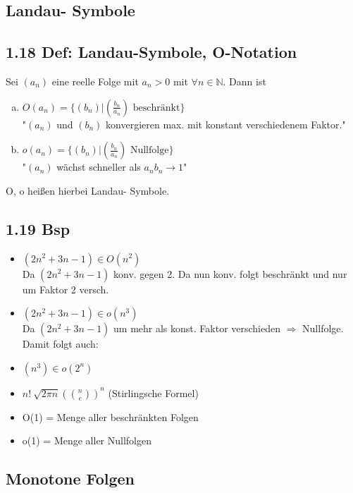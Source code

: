 \documentclass[12pt]{article}
\begin{document}
\subsection*{Landau- Symbole}

\subsection*{1.18 Def: Landau-Symbole, O-Notation}
Sei $(a_n)$ eine reelle Folge mit $a_n > 0$ mit $ \forall n \in \mathbb{N}$. Dann ist

\begin{enumerate}[a)]
\item $O(a_n) = \{ (b_n) | (\frac{b_n}{a_n}) \text{ beschränkt}\}$\\
	"$(a_n)$ und $(b_n)$ konvergieren max. mit konstant verschiedenem Faktor."\\
	
\item $o(a_n) = \{(b_n) | (\frac{b_n}{a_n}) \text{  Nullfolge} \}$\\
	"$(a_n)$ wächst schneller als  ${a_n}{b_n} \rightarrow 1$"
\end{enumerate}
O, o heißen hierbei Landau- Symbole. 



\subsection*{1.19 Bsp}
\begin{itemize}
	\item $(2n^2 + 3n -1) \in O(n^2)$\\
			Da  $(2n^2 + 3n -1)$ konv. gegen 2. Da nun konv. folgt beschränkt und nur um Faktor 2 versch. 
	\item  $(2n^2 + 3n -1) \in o(n^3)$\\
			Da  $(2n^2 + 3n -1)$ um mehr als konst. Faktor verschieden $\Rightarrow $ Nullfolge.\\
			 Damit folgt auch:
	\item  $(n^3) \in o(2^n)$
	\item $n! ~ \sqrt{2 \pi n} (\binom{n}{e})^n$ (Stirlingsche Formel)
	\item O(1) = Menge aller beschränkten Folgen 
	\item o(1) = Menge aller Nullfolgen
\end{itemize}


\subsection*{Monotone Folgen}
\end{document}
